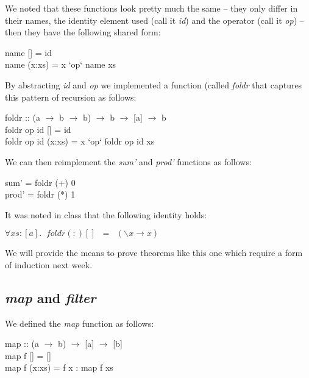 \documentclass[11pt]{article}
\begin{document}
We noted that these functions look pretty much the same -- they only differ in
their names, the identity element used (call it {\em{id}}) and the operator
(call it {\it{op}}) -- then they have the following shared form:

\begin{program**}
\> name [] = id\\
\> name (x:xs) = x `op` name xs\\
\end{program**}

By abstracting {\it{id}} and {\it{op}} we implemented a function (called
{\it{foldr}} that captures this pattern of recursion as follows:

\begin{program**}
\> foldr :: (a $\rightarrow$ b $\rightarrow$ b) $\rightarrow$ b $\rightarrow$ [a] $\rightarrow$ b\\
\> foldr op id [] = id\\
\> foldr op id (x:xs) = x `op` foldr op id xs\\
\end{program**}

We can then reimplement the {\it{sum'}} and {\it{prod'}} functions as follows:

\begin{program**}
\> sum' = foldr (+) 0  \\
\> prod' = foldr (*) 1\\
\end{program**}

It was noted in class that the following identity holds:

\begin{theorem}[]
$\forall{} xs : [a].\;\; {\mathit{foldr}} (:) [] \;\;=\;\; (\backslash{}x \rightarrow{}x)$
\end{theorem}

We will provide the means to prove theorems like this one which require a form
of induction next week.

\subsection{{\it{map}} and {\it{filter}}}


We defined the {\it{map}} function as follows:

\begin{program**}
\> map :: (a $\rightarrow$ b) $\rightarrow$ [a] $\rightarrow$ [b]\\
\> map f [] = [] \\
\> map f (x:xs) = f x : map f xs\\
\end{program**}
\end{document}

